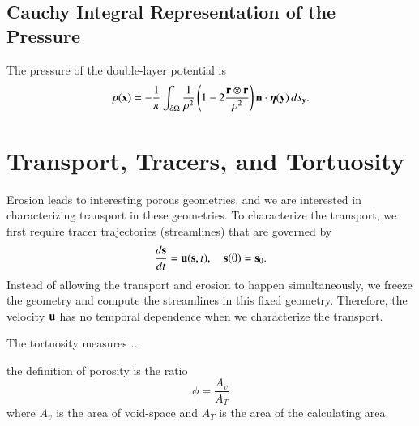 \documentclass[preprint, 10pt]{elsarticle}
\begin{document}
\subsection{Cauchy Integral Representation of the Pressure}
The pressure of the double-layer potential is
\begin{align}
  p({\mathbf{x}}) = -\frac{1}{\pi} \int_{{\partial}\Omega} \frac{1}{\rho^2}
    \left(1 - 2 \frac{{\mathbf{r}} \otimes {\mathbf{r}}}{\rho^2} \right) {\mathbf{n}}
    \cdot {\boldsymbol\eta}({\mathbf{y}}) \, ds_{\mathbf{y}}.
\end{align}




\section{Transport, Tracers, and Tortuosity}
Erosion leads to interesting porous geometries, and we are interested in
characterizing transport in these geometries.  To characterize the
transport, we first require tracer trajectories (streamlines) that are
governed by
\begin{align}
  \frac{d{\mathbf{s}}}{dt} = {\mathbf{u}}({\mathbf{s}},t), \quad {\mathbf{s}}(0) = {\mathbf{s}}_0.
\end{align}
Instead of allowing the transport and erosion to happen simultaneously,
we freeze the geometry and compute the streamlines in this fixed
geometry.  Therefore, the velocity ${\mathbf{u}}$ has no temporal dependence when
we characterize the transport.

The tortuosity measures ...

{\color{red} the definition of porosity is the ratio 
$$\phi=\frac{A_v}{A_T}$$
where $A_v$ is the area of void-space and $A_T$ is the area of the calculating area.
}  

\end{document}
